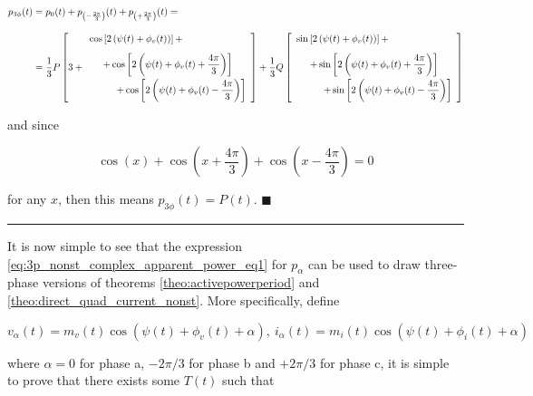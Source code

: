 \begin{align}
	p_{3\phi}(t) &= p_{0}(t) + p_{\left(-\frac{2\pi}{3}\right)}(t) + p_{\left(+\frac{2\pi}{3}\right)}(t) = \nonumber\\[3mm] &= \dfrac{1}{3}P\left[ 3 + \begin{array}{l} \cos\left[2\left(\psi(t) + \phi_v(t)\right) \right] + \\[3mm] \hspace{5mm} + \cos\left[2\left(\psi(t) + \phi_v(t) + \dfrac{4\pi}{3}\right) \right] \\[3mm] \hspace{10mm} + \cos\left[2\left(\psi(t) + \phi_v(t) - \dfrac{4\pi}{3}\right) \right] \end{array}\right] + \dfrac{1}{3}Q\left[\begin{array}{l} \sin\left[2\left(\psi(t) + \phi_v(t)\right) \right] + \\[3mm] \hspace{5mm} + \sin\left[2\left(\psi(t) + \phi_v(t) + \dfrac{4\pi}{3}\right) \right] \\[3mm] \hspace{10mm} + \sin\left[2\left(\psi(t) + \phi_v(t) - \dfrac{4\pi}{3}\right) \right] \end{array}\right]
\end{align}

	\noindent and since

\begin{equation} \cos\left(x\right) + \cos\left(x + \dfrac{4\pi}{3}\right) + \cos\left(x - \dfrac{4\pi}{3}\right) = 0 \end{equation}

	\noindent for any $x$, then this means $p_{3\phi}(t) = P(t)$. \hfill$\blacksquare$
\vspace{5mm}
\hrule
\vspace{5mm} %

	It is now simple to see that the expression \eqref{eq:3p_nonst_complex_apparent_power_eq1} for $p_\alpha$ can be used to draw three-phase versions of theorems \ref{theo:activepowerperiod} and \ref{theo:direct_quad_current_nonst}. More specifically, define

\begin{equation} v_\alpha(t) = m_v(t)\cos\left( \psi(t) + \phi_v(t) + \alpha\right),\ i_\alpha(t) = m_i(t)\cos\left(\psi(t) + \phi_i(t) + \alpha\right) \end{equation}

	\noindent where $\alpha = 0$ for phase a, $-2\pi/3$ for phase b and $+2\pi/3$ for phase c, it is simple to prove that there exists some $T(t)$ such that

